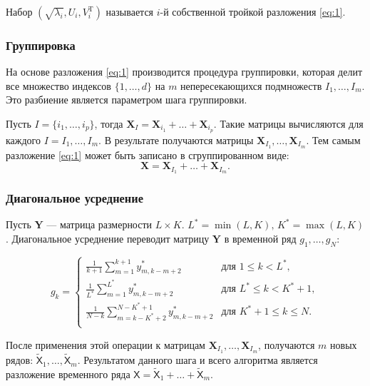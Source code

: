 \documentclass[a4paper, 11pt]{article}
\newcommand{\TS}{\mathsf{X}}
\begin{document}
Набор $( \sqrt{\lambda_i}, U_i, V_{i}^{\mathrm{T}})$ называется $i$-й собственной тройкой разложения \eqref{eq:1}.

\subsubsection{Группировка}
На основе разложения \eqref{eq:1} производится процедура группировки, которая делит все множество индексов $\{1, \dots, d\}$ на $m$ непересекающихся подмножеств $I_1, \dots, I_m$. Это разбиение является параметром шага группировки.

Пусть $I = \{i_1, \dots, i_p\}$, тогда $\mathbf{X}_I =
	\mathbf{X}_{i_1} + \dots + \mathbf{X}_{i_p}$. Такие матрицы вычисляются для каждого $I = I_1, \dots, I_m$.
В результате получаются матрицы $\mathbf{X}_{I_1}, \dots, \mathbf{X}_{I_m}$. Тем самым разложение \eqref{eq:1} может быть записано в сгруппированном виде:
\begin{equation*}
	\mathbf{X} = \mathbf{X}_{I_1} + \dots + \mathbf{X}_{I_m}.
\end{equation*}

\subsubsection{Диагональное усреднение}
Пусть $\mathbf{Y}$ --- матрица размерности $L \times K$. $L^* = \min(L, K), \, K^* = \max(L,K)$. Диагональное усреднение переводит матрицу $\mathbf{Y}$ в временной ряд $g_1, \dots, g_{N} $:

\begin{equation*}
	g_{k}=
	\begin{cases}
		\frac{1}{k+1} \sum\limits_{m=1}^{k+1} y_{m,k-m+2}^{*}           &
		\text{для } 1 \leq k < L^*,                                       \\

		\frac{1}{L^{*}} \sum\limits_{m=1}^{L^*} y_{m,k-m+2}^{*}         &
		\text{для } L^* \leq k < K^*+1 ,                                  \\

		\frac{1}{N-k} \sum\limits_{m=k-K^*+2}^{N-K^*+1} y_{m,k-m+2}^{*} &
		\text{для } K^*+1 \leq k \leq N .                                 \\
	\end{cases}
\end{equation*}


После применения этой операции к матрицам $ \mathbf{X}_{I_1}, \dots, \mathbf{X}_{I_m}$, получаются $m$ новых рядов: $\widetilde{\TS}_1, \dots, \widetilde{\TS}_m$.
Результатом данного шага и всего алгоритма является разложение временного ряда $\TS  = \widetilde{\TS}_1 + \dots + \widetilde{\TS}_m$.
\end{document}
